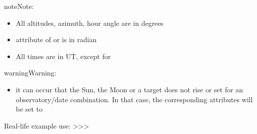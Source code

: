 \documentclass[letterpaper,10pt,english]{sphinxmanual}
\begin{document}
\begin{notice}{note}{Note:}\begin{itemize}
\item {} 
All altitudes, azimuth, hour angle are in degrees

\item {} 
 attribute of  or  is in radian

\item {} 
All times are in UT, except for 

\end{itemize}
\end{notice}

\begin{notice}{warning}{Warning:}\begin{itemize}
\item {} 
it can occur that the Sun, the Moon or a target does not rise or set for an observatory/date combination. In that case, the corresponding attributes will be set to 

\end{itemize}
\end{notice}

Real-life example use:
\textgreater{}\textgreater{}\textgreater{}
\end{document}
